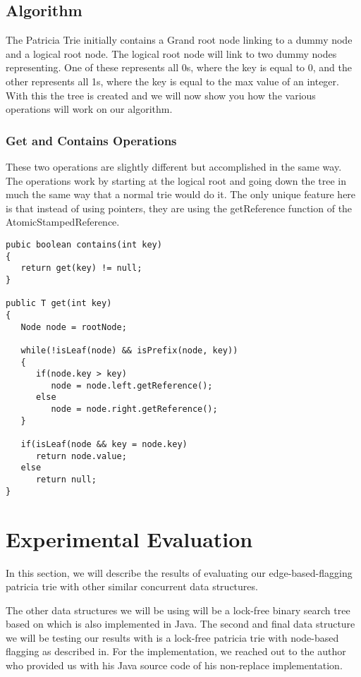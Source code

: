 \documentclass[conference]{IEEEtran}
\begin{document}
\subsection{Algorithm}
The Patricia Trie initially contains a Grand root node linking to a dummy node and a logical root node. The logical root node will link to two dummy nodes representing. One of these represents all 0s, where the key is equal to 0, and the other represents all 1s, where the key is equal to the max value of an integer. With this the tree is created and we will now show you how the various operations will work on our algorithm.

\subsubsection{Get and Contains Operations}
These two operations are slightly different but accomplished in the same way. The operations work by starting at the logical root and going down the tree in much the same way that a normal trie would do it. The only unique feature here is that instead of using pointers, they are using the getReference function of the AtomicStampedReference.
\begin{lstlisting}
pubic boolean contains(int key)
{
   return get(key) != null;
}

public T get(int key)
{
   Node node = rootNode;

   while(!isLeaf(node) && isPrefix(node, key))
   {
      if(node.key > key)
         node = node.left.getReference();
      else
         node = node.right.getReference();
   }

   if(isLeaf(node && key = node.key)
      return node.value;
   else
      return null;
}
\end{lstlisting}

\section{Experimental Evaluation}
In this section, we will describe the results of evaluating our edge-based-flagging patricia trie with other similar concurrent data structures.

The other data structures we will be using will be a lock-free binary search tree based on\cite{Natarajan2014} which is also implemented in Java\cite{LFBST}. The second and final data structure we will be testing our results with is a lock-free patricia trie with node-based flagging as described in\cite{Shafiei2013}. For the implementation, we reached out to the author who provided us with his Java source code of his non-replace implementation.
\end{document}
